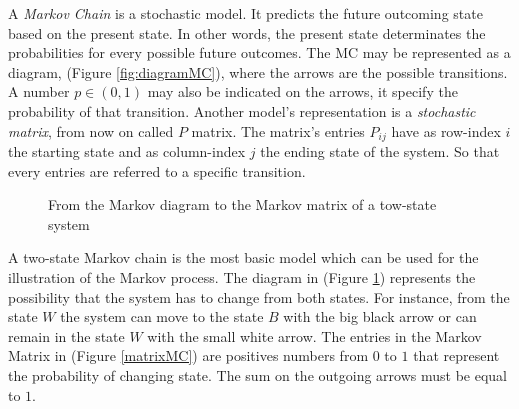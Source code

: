 \documentclass[class=article, crop=false]{standalone}
\begin{document}
\label{chap:MarkovChain}
A \emph{Markov Chain} is a stochastic model.
It predicts the future outcoming state based on the present state.
In other words, the present state determinates the probabilities for every possible future outcomes.
The MC may be represented as a diagram, (Figure \ref{fig:diagramMC}), where the arrows are the possible transitions.
A number $p \in (0,1)$ may also be indicated on the arrows, it specify the probability of that transition.
Another model's representation is a \emph{stochastic matrix}, from now on called $P$ matrix.
The matrix's entries $P_{ij}$ have as row-index $i$ the starting state and as column-index $j$ the ending state of the system.
So that every entries are referred to a specific transition.
\begin{figure}[h]
    \centering
    \quad\quad
    \caption{From the Markov diagram to the Markov matrix of a tow-state system}
    \label{fig:MarkovMatrix}
\end{figure}
A two-state Markov chain is the most basic model which can be used for the illustration of the Markov process.
The diagram in (Figure \ref{fig:MarkovMatrix}) represents the possibility that the system has to change from both states.
For instance, from the state $W$ the system can move to the state $B$ with the big black arrow or can remain in the state $W$ with the small white arrow.
The entries in the Markov Matrix in (Figure \ref{matrixMC}) are positives numbers from $0$ to $1$ that represent the probability of changing state.
The sum on the outgoing arrows must be equal to $1$.
\end{document}
